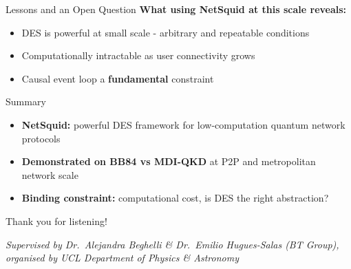 \documentclass[10pt]{beamer}
\begin{document}
\begin{frame}{Lessons and an Open Question}
    \textbf{What using NetSquid at this scale reveals:}

    \begin{itemize}\small
        \item DES is powerful at small scale - arbitrary and repeatable conditions
        \item Computationally intractable as user connectivity grows
        \item Causal event loop a \textbf{fundamental} constraint
    \end{itemize}

    \vspace{0.15cm}
    \setlength{\fboxsep}{8pt}\setlength{\fboxrule}{1.4pt}
\end{frame}

\begin{frame}{Summary}
    \begin{itemize}
        \item \textbf{NetSquid:} powerful DES framework for low-computation quantum network protocols
        \item \textbf{Demonstrated on BB84 vs MDI-QKD} at P2P and metropolitan network scale
        \item \textbf{Binding constraint:} computational cost, is DES the right abstraction?
    \end{itemize}

    \vspace{0.2cm}
    \begin{center}
        \large Thank you for listening!

        \vspace{0.1cm}
        \normalsize \textit{Supervised by Dr.\ Alejandra Beghelli \& Dr.\ Emilio Hugues-Salas (BT Group), organised by UCL Department of Physics \& Astronomy}
    \end{center}
\end{frame}

\appendix
\end{document}
